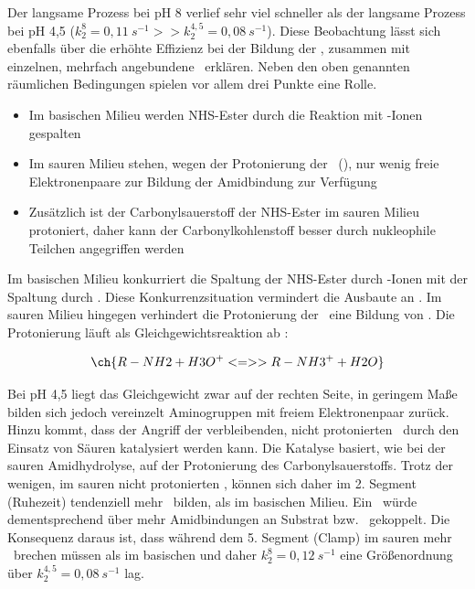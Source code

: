 Der langsame Prozess bei pH 8 verlief sehr viel schneller als der langsame Prozess bei pH 4,5 ($k_2^8 = 0,11~s^{-1} >> k_2^{4,5} = 0,08~s^{-1}$). Diese Beobachtung lässt sich ebenfalls über die erhöhte Effizienz bei der Bildung der \amid, zusammen mit einzelnen, mehrfach angebundene \spacer~erklären. Neben den oben genannten räumlichen Bedingungen spielen vor allem drei Punkte eine Rolle. 

\begin{itemize}
	\item Im basischen Milieu werden \ac{NHS}-Ester durch die Reaktion mit -Ionen gespalten \cite[289]{Latscha.2016}
	\item Im sauren Milieu stehen, wegen der Protonierung der \aminos~(), nur wenig freie Elektronenpaare zur Bildung der Amidbindung zur Verfügung \cite[189]{Latscha.2016}
	\item Zusätzlich ist der Carbonylsauerstoff der \ac{NHS}-Ester im sauren Milieu	 protoniert, daher kann der Carbonylkohlenstoff besser durch nukleophile Teilchen angegriffen werden \cite[288]{Latscha.2016}
\end{itemize}

Im basischen Milieu konkurriert die Spaltung der \ac{NHS}-Ester durch -Ionen mit der Spaltung durch \aminos. Diese Konkurrenzsituation vermindert die Ausbaute an \amide. Im sauren Milieu hingegen verhindert die Protonierung der \aminos~eine Bildung von \amide. Die Protonierung läuft als Gleichgewichtsreaktion ab \cite[189]{Latscha.2016}:

\[	\ch{R-NH2 + H3O^+ <=>> R-NH3^+ + H2O}	\]

Bei pH 4,5 liegt das Gleichgewicht zwar auf der rechten Seite, in geringem Maße bilden sich jedoch vereinzelt Aminogruppen mit freiem Elektronenpaar zurück. Hinzu kommt, dass der Angriff der verbleibenden, nicht protonierten \aminos~durch den Einsatz von Säuren katalysiert werden kann. Die Katalyse basiert, wie bei der sauren Amidhydrolyse, auf der Protonierung des Carbonylsauerstoffs. Trotz der wenigen, im sauren nicht protonierten \aminos, können sich daher im 2. Segment (Ruhezeit) tendenziell mehr \amide~bilden, als im basischen Milieu. Ein \spacer~würde dementsprechend über mehr Amidbindungen an Substrat bzw. \spitze~gekoppelt. Die Konsequenz daraus ist, dass während dem 5. Segment (Clamp) im sauren mehr \amide~brechen müssen als im basischen und daher  $k_2^{8} = 0,12~s^{-1}$ eine Größenordnung über $k_2^{4,5} = 0,08~s^{-1}$ lag.
